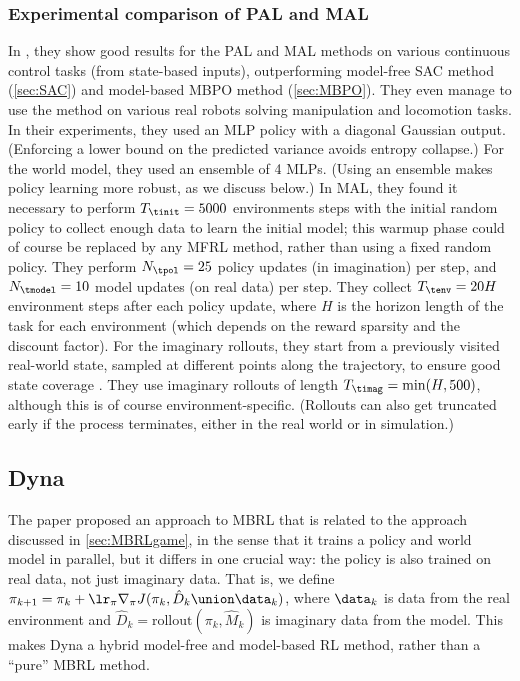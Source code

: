 {\subsubsection{Experimental comparison of PAL and MAL}

In \citep{Rajeswaran2020}, they show good results for the PAL and MAL
methods on various continuous control tasks (from state-based inputs),
outperforming model-free SAC method (\cref{sec:SAC})
and model-based MBPO method (\cref{sec:MBPO}).
They even manage to use the method on various real robots
solving manipulation and locomotion tasks.
In their experiments, they used an MLP policy with a diagonal Gaussian output.
(Enforcing a lower bound on the predicted variance avoids entropy collapse.)
For the world model, they used an ensemble of 4 MLPs.
(Using an ensemble makes policy learning more robust,
as we discuss below.)
In MAL, they found it necessary to perform 
$T_{\tinit}=5000$ environments steps with  the initial random policy
to collect enough data to learn the initial model;
this warmup phase could of course be replaced by any MFRL method,
rather than using a fixed random policy.
They perform $N_{\tpol}=25$ policy updates (in imagination) per step,
and $N_{\tmodel}=10$ model updates (on real data) per step.
They collect $T_{\tenv}=20 H$ environment steps after
each policy update, where $H$ is the horizon length of the task
for each environment (which depends on the reward sparsity and the discount factor).
For the imaginary rollouts,
they start from a previously visited real-world state,
sampled at different points along the trajectory,
to ensure good state coverage \citep{Rajeswaran2017}.
They use imaginary rollouts of length $T_{\timag}=\min(H,500)$,
although this is of course environment-specific.
(Rollouts can also get truncated early if the process terminates,
either in the real world or in simulation.)


}


\subsection{Dyna}
\label{sec:dyna}
\label{sec:MBPO}

The  paper \citep{Sutton1990}
proposed an approach to MBRL that is related
to the approach discussed in 
\cref{sec:MBRLgame},
in the sense that it trains a policy and world model in parallel,
but it differs in one crucial way:
the policy is also trained on real data, not just imaginary data.
That is, we define
$\pi_{k+1} = \pi_k + \lr_{\pi} \nabla_{\pi} J(\pi_k, \hat{D}_k \union \data_k)$,
where
 $\data_k$ is data
from the real environment
and 
$\hat{D}_k = \text{rollout}(\pi_k, \hat{M}_k)$
is imaginary data from the model.
This makes Dyna a hybrid model-free and model-based RL method,
rather than a ``pure'' MBRL method.

